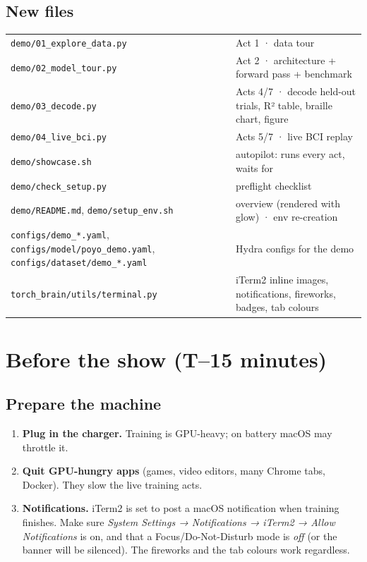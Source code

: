 \documentclass[11pt]{article}
\newcommand{\key}[1]{\tcbox[on line, colback=lbase, colframe=lsub!70, boxrule=0.5pt, arc=2.2pt, left=2.6pt, right=2.6pt, top=0.7pt, bottom=0.7pt, boxsep=0pt]{\small\strut #1}}
\newcommand{\RET}{{\symfont ⏎}}
\newcommand{\arr}{{\symfont →}}
\newcommand{\file}[1]{\textcolor{lteal}{\nolinkurl{#1}}}
\begin{document}
\subsection*{New files}
\begin{tabularx}{\linewidth}{>{\raggedright\arraybackslash}p{5.2cm} >{\raggedright\arraybackslash}X}
\toprule
\file{demo/01_explore_data.py} & Act 1 · data tour \\
\file{demo/02_model_tour.py} & Act 2 · architecture + forward pass + benchmark \\
\file{demo/03_decode.py} & Acts 4/7 · decode held-out trials, R² table, braille chart, figure \\
\file{demo/04_live_bci.py} & Acts 5/7 · live BCI replay \\
\file{demo/showcase.sh} & autopilot: runs every act, waits for \key{\RET} \\
\file{demo/check_setup.py} & preflight checklist \\
\file{demo/README.md}, \file{demo/setup_env.sh} & overview (rendered with glow) · env re-creation \\
\file{configs/demo_*.yaml}, \file{configs/model/poyo_demo.yaml}, \file{configs/dataset/demo_*.yaml} & Hydra configs for the demo \\
\file{torch_brain/utils/terminal.py} & iTerm2 inline images, notifications, fireworks, badges, tab colours \\
\bottomrule
\end{tabularx}

\section{Before the show (T--15 minutes)}

\subsection{Prepare the machine}
\begin{enumerate}[leftmargin=*]
\item \textbf{Plug in the charger.} Training is GPU-heavy; on battery macOS may throttle it.
\item \textbf{Quit GPU-hungry apps} (games, video editors, many Chrome tabs, Docker). They slow the live training acts.
\item \textbf{Notifications.} iTerm2 is set to post a macOS notification when training finishes. Make sure
  \emph{System Settings \arr{} Notifications \arr{} iTerm2 \arr{} Allow Notifications}
  is on, and that a Focus/Do-Not-Disturb mode is \emph{off} (or the banner will be silenced).
  The fireworks and the tab colours work regardless.
\end{enumerate}
\end{document}
